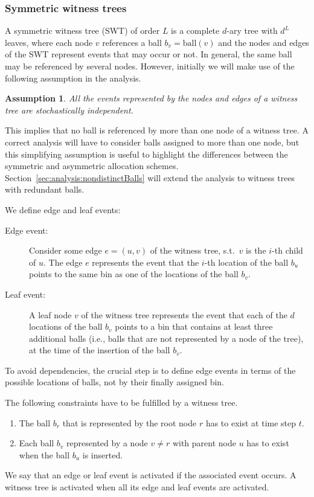 \documentclass[a4paper,12pt]{article}
\newtheorem{assumption}{Assumption}
\begin{document}
\subsubsection{Symmetric witness trees}
\label{sec:analysis:definitionSymWT}
A symmetric witness tree (SWT) of order $L$ is a complete $d$-ary tree with $d^{L}$ leaves, where each node $v$ references a ball $b_v = \mathrm{ball}(v)$ and the nodes and edges of the SWT represent events that may occur or not. In general, the same ball may be referenced by several nodes. However, initially we will make use of the following assumption in the analysis.
\begin{assumption}
\label{assumption:independence}
All the events represented by the nodes and edges of a witness tree are stochastically independent. 
\end{assumption} 
\noindent
This implies that no ball is referenced by more than one node of a witness tree. A correct analysis will have to consider balls assigned to more than one node, but this simplifying assumption is useful to highlight the differences between the symmetric and asymmetric allocation schemes. Section~\ref{sec:analysis:nondistinctBalls} will extend the analysis to witness trees with redundant balls.

We define edge and leaf events:
\begin{description}
\item [Edge event:] Consider some edge $e = (u,v)$ of the witness tree, s.t.~$v$ is the $i$-th child of $u$. The edge $e$ represents the event that the $i$-th location of the ball $b_u$ points to the same bin as one of the locations of the ball $b_v$. 
\item [Leaf event:] A leaf node $v$ of the witness tree represents the event that each of the $d$ locations of the ball $b_v$ points to a bin that contains at least three additional balls (i.e., balls that are not represented by a node of the tree), at the time of the insertion of the ball $b_v$.
\end{description}
To avoid dependencies, the crucial step is to define edge events in terms of the possible locations of balls, not by their finally assigned bin. 

The following constraints have to be fulfilled by a witness tree. 
\begin{enumerate}
\item The ball $b_r$ that is represented by the root node $r$ has to exist at time step $t$. 
\item Each ball $b_v$ represented by a node $v \neq r$ with parent node $u$ has to exist when the ball $b_u$ is inserted.
\end{enumerate}
We say that an edge or leaf event is activated if the associated event occurs. A witness tree is activated when all its edge and leaf events are activated. 
\end{document}
